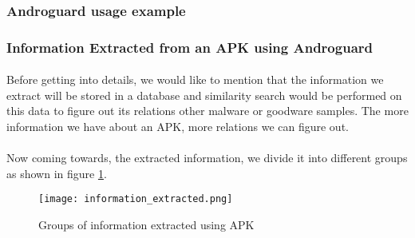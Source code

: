 \documentclass[../main.tex]{subfile}
\begin{document}
		\subsubsection{Androguard usage example}
		
		\subsubsection{Information Extracted from an APK using Androguard}
		\paragraph{} Before getting into details, we would like to mention that the information we extract will be stored in a database and similarity search would be performed on this data to figure out its relations other malware or goodware samples. The more information we have about an APK, more relations we can figure out.
		\paragraph{} Now coming towards, the extracted information, we divide it into different groups as shown in figure \ref{fig:info_extracted}.
		
		\begin{figure}
			\texttt{[image: information\_extracted.png]}
			\caption{Groups of information extracted using APK}
			\label{fig:info_extracted}
		\end{figure}
		
\end{document}
